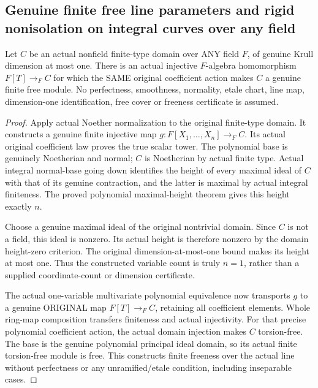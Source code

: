 \subsection{Genuine finite free line parameters and rigid nonisolation on integral curves over any field}
\label{subsec:finite-line-curve-nonisolation}

\begin{theorem}
\label{algebra:actual-finite-free-integral-curve-line-parameter}
\leanok
{}
Let $C$ be an actual nonfield finite-type domain over ANY field $F$,
of genuine Krull dimension at most one. There is an actual injective
$F$-algebra homomorphism $F[T]\to_F C$ for which the SAME original
coefficient action makes $C$ a genuine finite free module. No
perfectness, smoothness, normality, etale chart, line map, dimension-one
identification, free cover or freeness certificate is assumed.
\end{theorem}
\begin{proof}
Apply actual Noether normalization to the original finite-type
domain. It constructs a genuine finite injective map
$g:F[X_1,\dots,X_n]\to_F C$. Its actual original coefficient law
proves the true scalar tower. The polynomial base is genuinely
Noetherian and normal; $C$ is Noetherian by actual finite type.
Actual integral normal-base going down identifies the height of
every maximal ideal of $C$ with that of its genuine contraction,
and the latter is maximal by actual integral finiteness. The proved
polynomial maximal-height theorem gives this height exactly $n$.

Choose a genuine maximal ideal of the original nontrivial domain.
Since $C$ is not a field, this ideal is nonzero. Its actual height
is therefore nonzero by the domain height-zero criterion. The
original dimension-at-most-one bound makes its height at most one.
Thus the constructed variable count is truly $n=1$, rather than
a supplied coordinate-count or dimension certificate.

The actual one-variable multivariate polynomial equivalence now
transports $g$ to a genuine ORIGINAL map $F[T]\to_F C$, retaining
all coefficient elements. Whole ring-map composition transfers
finiteness and actual injectivity. For that precise polynomial
coefficient action, the actual domain injection makes $C$
torsion-free. The base is the genuine polynomial principal ideal
domain, so its actual finite torsion-free module is free. This
constructs finite freeness over the actual line without perfectness
or any unramified/etale condition, including inseparable cases.
\end{proof}

